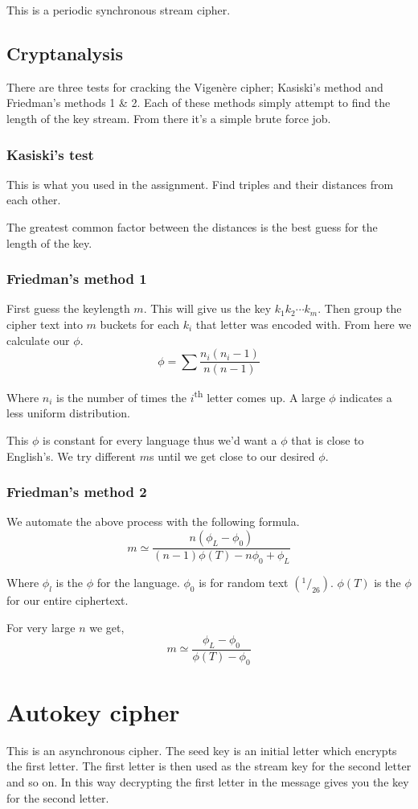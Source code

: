 \documentclass{report}
\newcommand{\ts}{\textsuperscript}
\begin{document}
This is a periodic synchronous stream cipher.

\subsection{Cryptanalysis}
There are three tests for cracking the Vigenère cipher; Kasiski's method and
Friedman's methods 1 \& 2. Each of these methods simply attempt to find the
length of the key stream. From there it's a simple brute force job.

\subsubsection{Kasiski's test}
This is what you used in the assignment. Find triples and their distances
from each other.

The greatest common factor between the distances is the best guess for the
length of the key.

\subsubsection{Friedman's method 1}
First guess the keylength $m$. This will give us the key
$k_1 k_2 \cdots k_m$. Then group the cipher text into $m$ buckets for each
$k_i$ that letter was encoded with. From here we calculate our $\phi$.
\[
    \phi = \sum \frac{n_i (n_i - 1)}{n(n-1)}
\]

Where $n_i$ is the number of times the $i$\ts{th} letter comes up. A large
$\phi$ indicates a less uniform distribution.

This $\phi$ is constant for every language thus we'd want a $\phi$ that
is close to English's. We try different $m$s until we get close to our
desired $\phi$.

\subsubsection{Friedman's method 2}
We automate the above process with the following formula.
\[
    m \simeq \frac{n(\phi_L - \phi_0)}{(n-1)\phi(T) - n\phi_0 + \phi_L}
\]

Where $\phi_l$ is the $\phi$ for the language. $\phi_0$ is for random text
$({}^1/_{26})$. $\phi(T)$ is the $\phi$ for our entire ciphertext.

For very large $n$ we get,
\[
    m \simeq \frac{\phi_L - \phi_0}{\phi(T) - \phi_0}
\]

\section{Autokey cipher}
This is an asynchronous cipher. The seed key is an initial letter which
encrypts the first letter. The first letter is then used as the stream key
for the second letter and so on. In this way decrypting the first letter in
the message gives you the key for the second letter.
\end{document}
